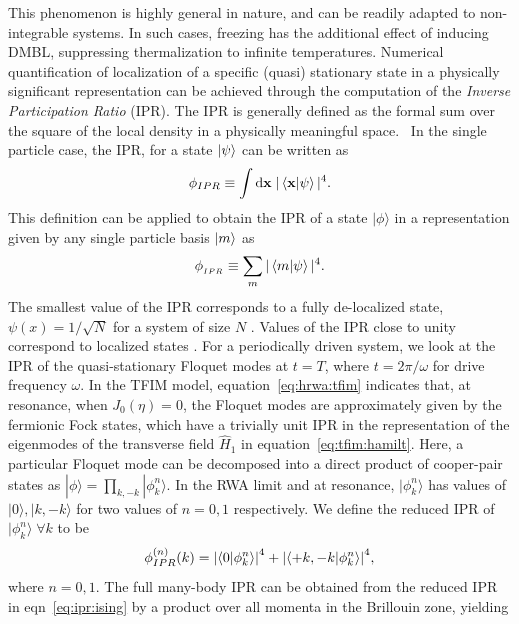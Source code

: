\documentclass[%
reprint,
superscriptaddress,
linenumbers,
amsmath,amssymb,
aps,
prb,
showkeys,
]{revtex4-2}
\begin{document}
	This phenomenon is highly general in nature, and can be readily adapted to non-integrable systems. In such cases, freezing has the additional effect of inducing DMBL, suppressing thermalization to infinite temperatures. Numerical quantification of localization of a specific (quasi) stationary state in a physically significant representation can be achieved through the computation of the \emph{Inverse Participation Ratio} (IPR).  {The IPR is generally defined as the formal sum over the square of the local density in a physically meaningful space.}~\cite{mukherjee_modulation-assisted_2015,lin_many-body_2018,murphy_generalized_2011, torres-herrera_self-averaging_2020} {In the single particle case,  the IPR, } for a state $\ket{\psi}$ can be written as
	\begin{equation*}
		\phi_{IPR}\equiv \int \mathrm{d}\mathbf{x}\;\vert\ip{\mathbf{x}}{\psi}\vert^4.
	\end{equation*}
	This definition can be {applied} to {obtain} the IPR of a state $|\phi\rangle$ in a representation given by {any single particle} basis $\ket{m}$ as 
	\begin{equation}
	\label{eq:ipr:defn}
	\phi_{{_{IPR}}} \equiv \sum_m\vert\ip{m}{\psi}\vert^4.
	\end{equation}
	The smallest value of the IPR corresponds to a fully de-localized state, $\psi(x)=1/\sqrt{N}$ for a system of size $N$ \cite{torres-herrera_self-averaging_2020,trivedi_can_2005}. Values of the IPR close to unity correspond to localized states \cite{Misguich2016}. For a periodically driven system, we look at the IPR of the quasi-stationary Floquet modes at $t=T$, where $t=2\pi/\omega$ for drive frequency $\omega$. In the TFIM model, equation~\ref{eq:hrwa:tfim} indicates that, at resonance, when $J_0(\eta)=0$, the Floquet modes are approximately given by the fermionic Fock states, which have a trivially unit IPR in the representation of the eigenmodes of the transverse field $\hat{H}_1$ in equation~\ref{eq:tfim:hamilt}. Here, a particular Floquet mode can be decomposed into a direct product of cooper-pair states as $|\phi\rangle = \prod_{k,-k}|\phi^n_k\rangle$. In the RWA limit and at resonance, $|\phi^n_k\rangle$ has values of $|0\rangle, |k,-k\rangle$ for two values of $n=0,1$ respectively. We define the reduced IPR of $|\phi^n_k\rangle\; \forall k$ to be
	\begin{equation}
	\label{eq:ipr:ising}
	\phi^{(n)}_{IPR}(k) = \abs{\ip{0}{\phi^n_k}}^4 + \abs{\ip{ +k, -k }{\phi^n_k}}^4,
	\end{equation}
	where $n=0,1$. {The full many-body IPR can be obtained from the reduced IPR in eqn}~\ref{eq:ipr:ising} {by a product over all momenta in the Brillouin zone, yielding}
\end{document}
